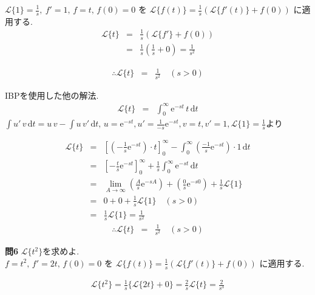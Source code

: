 ﻿\documentclass[a4j]{jarticle}
\begin{document}
\( \mathcal{L} \{ 1 \} = \frac{1}{s} ,\ f'=1 ,\, f=t ,\, f(0)=0 \)
を \( \mathcal{L} \{ f(t) \} = \frac{1}{s} \left( \mathcal{L} \{ f'(t) \} + f(0) \right) \) に適用する.
\begin{eqnarray*}
\mathcal{L} \{ t \} &=& \frac{1}{s} \left( \mathcal{L} \{ f' \} + f(0) \right) \\
                    &=& \frac{1}{s} \left( \frac{1}{s} + 0 \right) = \frac{1}{s^2}
\end{eqnarray*}

\begin{eqnarray*}
\therefore \mathcal{L} \{ t \} &=& \frac{1}{s^2} \quad(s>0)
\end{eqnarray*}

IBPを使用した他の解法.
\begin{eqnarray*}
\mathcal{L} \{ t \} &=& \int_0^\infty{ \mathrm{e}^{-st} \, t \, \mathrm{d}t }
\end{eqnarray*}
 \( \int{ u'\,v } \, \mathrm{d}t = u\,v - \int{ u\,v' } \, \mathrm{d}t ,\, u= \mathrm{e}^{-st}, u'=\frac{1}{-s}\mathrm{e}^{-st}, v=t, v'=1, \mathcal{L} \{ 1 \}=\frac{1}{s} \)より

\begin{eqnarray*}
\mathcal{L} \{ t \} &=& \left[(-\frac{1}{s}\mathrm{e}^{-st})\cdot t\right]_0^\infty - \int_0^\infty{(\frac{-1}{s}\mathrm{e}^{-st} )\cdot1 \, \mathrm{d}t } \\
                    &=& \left[-\frac{t}{s}\mathrm{e}^{-st}\right]_0^\infty + \frac{1}{s}\int_0^\infty{ \mathrm{e}^{-st}\, \mathrm{d}t } \\
                    &=& \lim_{A\to\infty}(\frac{A}{s} \mathrm{e}^{-sA}) + (\frac{0}{s}\mathrm{e}^{-s0}) + \frac{1}{s}\mathcal{L} \{ 1 \} \\
                    &=& 0 + 0 + \frac{1}{s} \mathcal{L} \{ 1 \} \quad(s>0) \\
                    &=& \frac{1}{s}\mathcal{L} \{ 1 \} = \frac{1}{s^2}
\end{eqnarray*}
\begin{eqnarray*}
\therefore \mathcal{L} \{ t \} &=& \frac{1}{s^2} \quad(s>0)
\end{eqnarray*}

\noindent
{\large {\bf 問6}}\/ \( \mathcal{L} \{ t^2 \} \)を求めよ. \\

\( f=t^2 ,\, f'=2t ,\, f(0) = 0 \) を \( \mathcal{L} \{ f(t) \} = \frac{1}{s} \left( \mathcal{L} \{ f'(t) \} + f(0) \right) \) に適用する.

\begin{eqnarray*}
\mathcal{L} \{ t^2 \} = \frac{1}{s} \{ \mathcal{L} \{ 2t \} + 0 \} = \frac{2}{s} \mathcal{L} \{ t \} = \frac{2}{s^3}
\end{eqnarray*}
\end{document}
